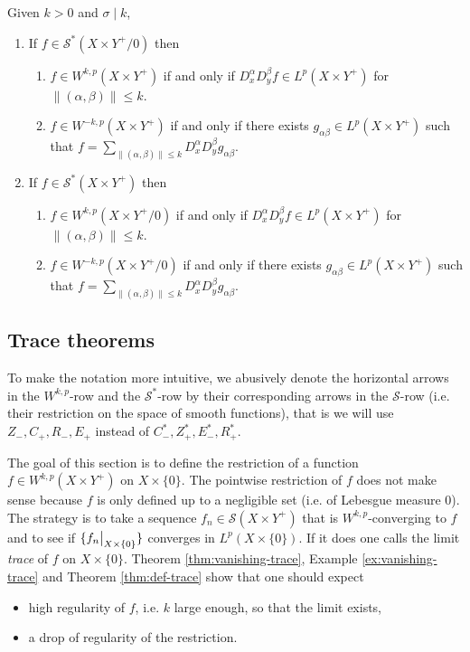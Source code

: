\begin{theorem}
\label{thm:descrpt-sobolev}
Given \(k>0\) and \(\sigma \mid k\),
\begin{enumerate}
\item If \(f\in \mathcal{S}^*(X\times Y^+/0)\) then 
\begin{enumerate}
\item \(f\in W^{k,p}(X\times Y^+)\) if and only if \(D^\alpha_x D^\beta_y f\in
      L^p(X\times Y^+)\) for \(\|(\alpha,\beta)\|\leq k\).
\item \(f\in W^{-k,p}(X\times Y^+)\) if and only if there exists \(g_{\alpha\beta}\in
      L^p(X\times Y^+)\) such that \(f = \sum_{\|(\alpha,\beta)\|\leq k} D^\alpha_x
      D^\beta_y g_{\alpha\beta}\).
\end{enumerate}
\item If \(f\in \mathcal{S}^*(X\times Y^+)\) then
\begin{enumerate}
\item \(f\in W^{k,p}(X\times Y^+/0)\) if and only if \(D^\alpha_x D^\beta_y f\in
      L^p(X\times Y^+)\) for \(\|(\alpha,\beta)\|\leq k\).
\item \(f\in W^{-k,p}(X\times Y^+/0)\) if and only if there exists \(g_{\alpha\beta}\in
      L^p(X\times Y^+)\) such that \(f = \sum_{\|(\alpha,\beta)\|\leq k} D^\alpha_x
      D^\beta_y g_{\alpha\beta}\).
\end{enumerate}
\end{enumerate}
\end{theorem}



\subsection{Trace theorems}
\label{sec:orgfbd3028}
To make the notation more intuitive, we abusively denote the horizontal arrows in the \(W^{k,p}\)-row and the \(\mathcal{S}^*\)-row by their corresponding arrows in the \(\mathcal{S}\)-row (i.e. their restriction on the space of smooth functions), that is we will use \(Z_-, C_+, R_-, E_+\) instead of \(C_-^*,
Z_+^*, E_-^*, R_+^*\).

The goal of this section is to define the restriction of a function \(f\in
W^{k,p}(X\times Y^+)\) on \(X\times \{0\}\). The pointwise restriction of \(f\) does
not make sense because \(f\) is only defined up to a negligible set (i.e. of Lebesgue
measure 0). The strategy is to take a sequence \(f_n\in \mathcal{S}(X\times Y^+)\) that is
\(W^{k,p}\)-converging to \(f\) and to see if \(\{\restr{f_n}{X\times \{0\}}\}\)
converges in \(L^p(X\times \{0\})\). If it does one calls the limit \emph{trace} of \(f\) on
\(X\times \{0\}\). Theorem \ref{thm:vanishing-trace}, Example \ref{ex:vanishing-trace} and
Theorem \ref{thm:def-trace} show that one should expect 
\begin{itemize}
\item high regularity of \(f\), i.e. \(k\) large enough, so that the limit exists,
\item a drop of regularity of the restriction.
\end{itemize}


